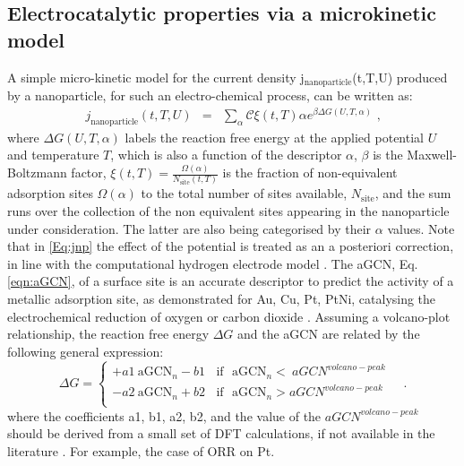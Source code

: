 \subsection{Electrocatalytic properties via a microkinetic model}
\label{sec:electrocat}
A simple micro-kinetic model for the current density j$_{\mathrm{nanoparticle}}$(t,T,U) produced by a nanoparticle, for such an electro-chemical process, can be written as:
\begin{eqnarray}
j_{\mathrm{nanoparticle}}(t,T,U) &=&\sum_{\alpha} \mathcal{C} \xi(t,T)\alpha
e^{\beta \Delta G (U, T, \alpha)} \mbox{~,}
\label{Eq:jnp}
\end{eqnarray}
where $\Delta G (U, T, \alpha)$ labels the reaction free energy at the applied potential $U$ and temperature $T$, which is also a function of the descriptor $\alpha$, $\beta$ is the Maxwell-Boltzmann factor, $\xi(t,T) = \frac{\Omega(\alpha)}{N_{\mathrm{site}}(t,T)}$ is the fraction of non-equivalent adsorption sites $\Omega(\alpha)$ to the total number of sites available, $N_{\mathrm{site}}$, and the sum runs over the collection of the non equivalent sites appearing in the nanoparticle under consideration. The latter are also being categorised by their $\alpha$ values.
%
Note that in \ref{Eq:jnp} the effect of the potential is treated as an a posteriori correction, in line with the computational hydrogen electrode model \cite{Norskov1998}. 
%
The aGCN, Eq. \ref{eqn:aGCN}, of a surface site is an accurate descriptor to predict the activity of a metallic adsorption site, as demonstrated for Au, Cu, Pt, PtNi, catalysing the electrochemical reduction of oxygen or carbon dioxide  \cite{Calle-Vallejo2014,Calle2015,Zhao2016}.
%
Assuming a volcano-plot relationship, 
the reaction free energy $\Delta G$ and the aGCN are related by the following general expression:
\begin{equation}
\Delta G =
    \begin{cases}
     + a1 ~ \textrm{aGCN}_n - b1 ~~~~\textrm{if~ aGCN}_n<~ aGCN^{volcano-peak} \\
     - a2 ~ \textrm{aGCN}_n + b2 ~~~~\textrm{if~ aGCN}_n> aGCN^{volcano-peak} \\
    \end{cases}
    \mbox{~~~.}
\label{eq:volcano}
\end{equation}
%
where the coefficients a1, b1, a2, b2, and the value of the $aGCN^{volcano-peak}$ should be derived from a small set of DFT calculations, if not available in the literature \cite{FCVChemSci2018}. For example, the case of ORR on Pt\cite{Rossi2020}.

